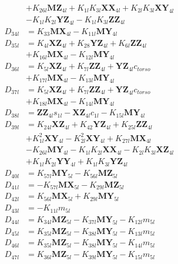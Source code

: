 \begin{multicols}{2}
\begin{align}
&+ K_{26l}\mathbf{MZ}_{4l} + K_{1l}K_{3l}\mathbf{XX}_{4l} + K_{2l}K_{3l}\mathbf{XY}_{4l}  \nonumber \\
&- K_{1l}K_{2l}\mathbf{YZ}_{4l} - K_{1l}K_{3l}\mathbf{ZZ}_{4l} \nonumber \\
D_{34l} &= K_{33}\mathbf{MX}_{4l} - K_{11l}\mathbf{MY}_{4l} \nonumber \\
D_{35l} &= K_{4l}\mathbf{XZ}_{4l} + K_{28}\mathbf{YZ}_{4l} + K_{6l}\mathbf{ZZ}_{4l}  \nonumber \\
&+ K_{16l}\mathbf{MX}_{4l} - K_{12l}\mathbf{MY}_{4l} \nonumber \\
D_{36l} &= K_{5l}\mathbf{XZ}_{4l} + K_{7l}\mathbf{ZZ}_{4l} + \mathbf{YZ}_{4l}c_{torso}  \nonumber \\
&+ K_{17l}\mathbf{MX}_{4l} - K_{13l}\mathbf{MY}_{4l} \nonumber \\
D_{37l} &= K_{5l}\mathbf{XZ}_{4l} + K_{7l}\mathbf{ZZ}_{4l} + \mathbf{YZ}_{4l}c_{torso}  \nonumber \\
&+ K_{18l}\mathbf{MX}_{4l} - K_{14l}\mathbf{MY}_{4l} \nonumber \\
D_{38l} &= \mathbf{ZZ}_{4l}s_{1l} - \mathbf{XZ}_{4l}c_{1l} - K_{15l}\mathbf{MY}_{4l} \nonumber \\
D_{39l} &= K_{24l}\mathbf{XZ}_{4l} + K_{42}\mathbf{YZ}_{4l} + K_{25l}\mathbf{ZZ}_{4l}  \nonumber \\
&+ K_{1l}^2\mathbf{XY}_{4l} - K_{2l}^2\mathbf{XY}_{4l} + K_{27l}\mathbf{MX}_{4l}  \nonumber \\
&- K_{26l}\mathbf{MY}_{4l} - K_{1l}K_{2l}\mathbf{XX}_{4l} - K_{2l}K_{3l}\mathbf{XZ}_{4l}  \nonumber \\
&+ K_{1l}K_{2l}\mathbf{YY}_{4l} + K_{1l}K_{3l}\mathbf{YZ}_{4l} \nonumber \\
D_{40l} &= K_{57l}\mathbf{MY}_{5l} - K_{56l}\mathbf{MZ}_{5l} \nonumber \\
D_{41l} &= - K_{57l}\mathbf{MX}_{5l} - K_{29l}\mathbf{MZ}_{5l} \nonumber \\
D_{42l} &= K_{56l}\mathbf{MX}_{5l} + K_{29l}\mathbf{MY}_{5l} \nonumber \\
D_{43l} &= -K_{11l}m_{5l} \nonumber \\
D_{44l} &= K_{34l}\mathbf{MZ}_{5l} - K_{37l}\mathbf{MY}_{5l} - K_{12l}m_{5l} \nonumber \\
D_{45l} &= K_{35l}\mathbf{MZ}_{5l} - K_{38l}\mathbf{MY}_{5l} - K_{13l}m_{5l} \nonumber \\
D_{46l} &= K_{35l}\mathbf{MZ}_{5l} - K_{38l}\mathbf{MY}_{5l} - K_{14l}m_{5l} \nonumber \\
D_{47l} &= K_{36l}\mathbf{MZ}_{5l} - K_{39l}\mathbf{MY}_{5l} - K_{15l}m_{5l} \nonumber \\

\end{align}
\end{multicols}
